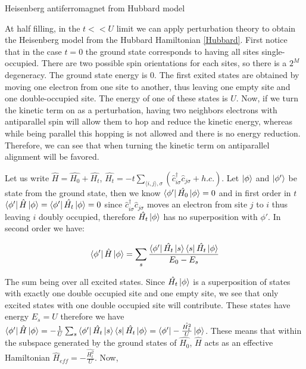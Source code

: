 \begin{section}{Heisenberg antiferromagnet from Hubbard model}

At half filling, in the $t << U$ limit we can apply perturbation theory to obtain the Heisenberg model from the Hubbard Hamiltonian \ref{Hubbard}. First notice that in the case $t = 0$ the ground state corresponds to having all sites single-occupied. There are two possible spin orientations for each sites, so there is a $2^M$ degeneracy. The ground state energy is $0$. The first exited states are obtained by moving one electron from one site to another, thus leaving one empty site and one double-occupied site. The energy of one of these states is $U$. Now, if we turn the kinetic term on as a perturbation, having two neighbors electrons with antiparallel spin will allow them to hop and reduce the kinetic energy, whereas while being parallel this hopping is not allowed and there is no energy reduction. Therefore, we can see that when turning the kinetic term on antiparallel alignment will be favored. 

Let us write $\hat{H} = \hat{H_0} + \hat{H_t}$, $\hat{H_t} = -t\sum_{\langle i,j \rangle, \sigma}(\hat{c}_{i \sigma}^\dagger \hat{c}_{j \sigma} + h.c.)$. Let $\ket{\phi}$ and $\ket{\phi'}$ be state from the ground state, then we know $\bra{\phi'} \hat{H_0} \ket{\phi} = 0$ and in first order in $t$ $\bra{\phi'} \hat{H} \ket{\phi} = \bra{\phi'} \hat{H_t} \ket{\phi} = 0$ since $\hat{c}_{i \sigma}^\dagger \hat{c}_{j \sigma}$ moves an electron from site $j$ to $i$ thus leaving $i$ doubly occupied, therefore $\hat{H_t} \ket{\phi}$ has no superposition with $\phi'$. In second order we have:

\begin{equation}
\bra{\phi'} \hat{H} \ket{\phi} = \sum_s \frac{\bra{\phi'} \hat{H_t} \ket{s}\bra{s} \hat{H_t} \ket{\phi}}{E_0-E_s}
\end{equation}

The sum being over all excited states. Since $\hat{H_t}\ket{\phi}$ is a superposition of states with exactly one double occupied site and one empty site, we see that only excited states with one double occupied site will contribute. These states have energy $E_s = U$ therefore we have $\bra{\phi'} \hat{H} \ket{\phi} = -\frac{1}{U}\sum_s \bra{\phi'} \hat{H_t} \ket{s}\bra{s} \hat{H_t} \ket{\phi} = \bra{\phi'} -\frac{\hat{H_t^2}}{U} \ket{\phi}$. These means that within the subspace generated by the ground states of $\hat{H_0}$, $\hat{H}$ acts as an effective Hamiltonian $\hat{H}_{eff} = -\frac{\hat{H_t^2}}{U}$. Now,


\end{section}
